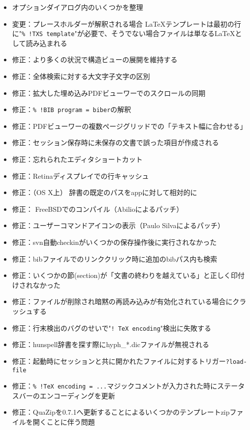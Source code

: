\begin{itemize}
    \item
      オプションダイアログ内のいくつかを整理
    \item
      変更：プレースホルダーが解釈される場合
      LaTeXテンプレートは最初の行に"\verb+% !TXS template+"が必要で、そうでない場合ファイルは単なるLaTeXとして読み込まれる
    \item
      修正：より多くの状況で構造ビューの展開を維持する
    \item
      修正：全体検索に対する大文字子文字の区別
    \item
      修正：拡大した埋め込みPDFビューワーでのスクロールの同期
    \item
      修正：\verb+% !BIB program = biber+の解釈
    \item
      修正：PDFビューワーの複数ページグリッドでの「テキスト幅に合わせる」
    \item
      修正：セッション保存時に未保存の文書で誤った項目が作成される
    \item
      修正：忘れられたエディタショートカット
    \item
      修正：Retinaディスプレイでの行キャッシュ
    \item
      修正：（OS X上） 辞書の既定のパスをappに対して相対的に
    \item
      修正： FreeBSDでのコンパイル（Abilioによるパッチ）
    \item
      修正：ユーザーコマンドアイコンの表示（Paulo Silvaによるパッチ）
    \item
      修正：svn自動checkinがいくつかの保存操作後に実行されなかった
    \item
      修正：bibファイルでのリンククリック時に追加のbibパス内も検索
    \item
      修正：いくつかの節(section)が「文書の終わりを越えている」と正しく印付けされなかった
    \item
      修正：ファイルが削除され暗黙の再読み込みが有効化されている場合にクラッシュする
    \item
      修正：行末検出のバグのせいで"\verb+! TeX encoding+"検出に失敗する
    \item
      修正：hunspell辞書を探す際にhyph\_*.dicファイルが無視される
    \item
      修正：起動時にセッションと共に開かれたファイルに対するトリガー\verb+?load-file+
    \item
      修正：\verb+% !TeX encoding = ...+マジックコメントが入力された時にステータスバーのエンコーディングを更新
    \item
      修正：QuaZipを0.7.1へ更新することによるいくつかのテンプレートzipファイルを開くことに伴う問題

\end{itemize}
